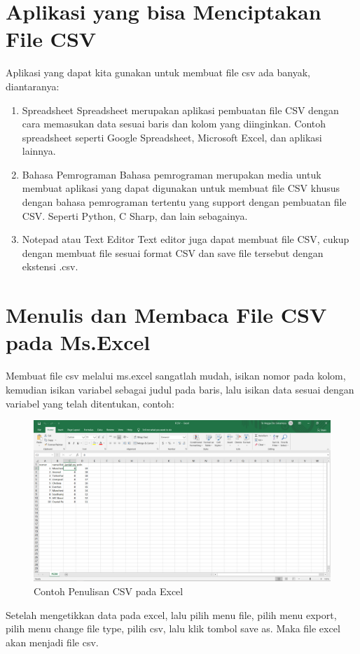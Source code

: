 \section{Aplikasi yang bisa Menciptakan File CSV}
Aplikasi yang dapat kita gunakan untuk membuat file csv ada banyak, diantaranya:
\begin{enumerate}
 \item Spreadsheet \linebreak Spreadsheet merupakan aplikasi pembuatan file CSV dengan cara memasukan data sesuai baris dan kolom yang diinginkan. Contoh spreadsheet seperti Google Spreadsheet, Microsoft Excel, dan aplikasi lainnya. 
 \item Bahasa Pemrograman \linebreak Bahasa pemrograman merupakan media untuk membuat aplikasi yang dapat digunakan untuk membuat file CSV khusus dengan bahasa pemrograman tertentu yang support dengan pembuatan file CSV. Seperti Python, C Sharp, dan lain sebagainya.
 \item Notepad atau Text Editor \linebreak Text editor juga dapat membuat file CSV, cukup dengan membuat file sesuai format CSV dan save file tersebut dengan ekstensi .csv.
\end{enumerate}

\section{Menulis dan Membaca File CSV pada Ms.Excel}
Membuat file csv melalui ms.excel sangatlah mudah, isikan nomor pada kolom, kemudian isikan variabel sebagai judul pada baris, lalu isikan data sesuai dengan variabel yang telah ditentukan, contoh:\\
\begin{figure}[H]
        \centerline{\includegraphics[scale=0.3]{figures/contoh}}
        \caption{Contoh Penulisan CSV pada Excel}
		\label{contoh}
\end{figure}
Setelah mengetikkan data pada excel, lalu pilih menu file, pilih menu export, pilih menu change file type, pilih csv, lalu klik tombol save as. Maka file excel akan menjadi file csv.




